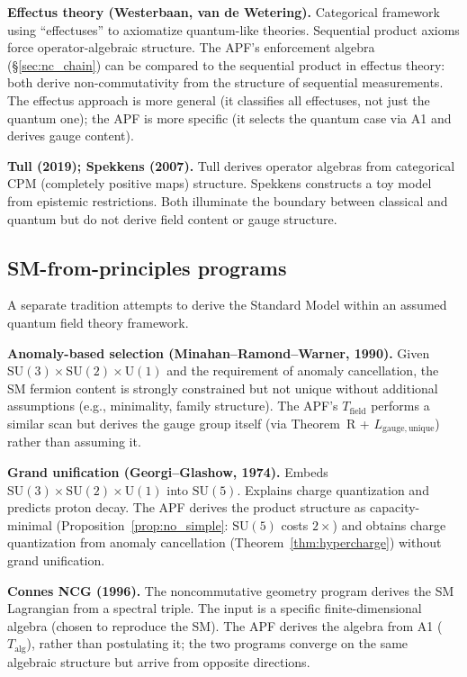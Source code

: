 \documentclass[11pt,a4paper]{article}
\theoremstyle{definition}
\newcommand{\SU}{\mathrm{SU}}
\newcommand{\U}{\mathrm{U}}
\begin{document}
\smallskip\noindent\textbf{Effectus theory (Westerbaan, van de Wetering).}\quad
Categorical framework using ``effectuses'' to axiomatize quantum-like
theories.  Sequential product axioms force operator-algebraic structure.
The APF's enforcement algebra (\S\ref{sec:nc_chain}) can be compared
to the sequential product in effectus theory: both derive
non-commutativity from the structure of sequential measurements.  The
effectus approach is more general (it classifies all effectuses, not
just the quantum one); the APF is more specific (it selects the
quantum case via A1 and derives gauge content).

\smallskip\noindent\textbf{Tull (2019); Spekkens (2007).}\quad
Tull derives operator algebras from categorical CPM (completely positive
maps) structure.  Spekkens constructs a toy model from epistemic
restrictions.  Both illuminate the boundary between classical and
quantum but do not derive field content or gauge structure.


\subsection{SM-from-principles programs}
\label{sec:sm_programs}

A separate tradition attempts to derive the Standard Model within an
assumed quantum field theory framework.

\smallskip\noindent\textbf{Anomaly-based selection
(Minahan--Ramond--Warner, 1990).}\quad
Given $\SU(3) \times \SU(2) \times \U(1)$ and the requirement of
anomaly cancellation, the SM fermion content is strongly constrained
but not unique without additional assumptions (e.g., minimality,
family structure).  The APF's $T_{\mathrm{field}}$ performs a similar
scan but derives the gauge group itself (via Theorem~R +
$L_{\mathrm{gauge,unique}}$) rather than assuming it.

\smallskip\noindent\textbf{Grand unification (Georgi--Glashow, 1974).}\quad
Embeds $\SU(3) \times \SU(2) \times \U(1)$ into $\SU(5)$.  Explains
charge quantization and predicts proton decay.  The APF derives the
product structure as capacity-minimal
(Proposition~\ref{prop:no_simple}: $\SU(5)$ costs $2\times$) and
obtains charge quantization from anomaly cancellation
(Theorem~\ref{thm:hypercharge}) without grand unification.

\smallskip\noindent\textbf{Connes NCG (1996).}\quad
The noncommutative geometry program derives the SM Lagrangian from a
spectral triple.  The input is a specific finite-dimensional algebra
(chosen to reproduce the SM).  The APF derives the algebra from A1
($T_{\mathrm{alg}}$), rather than postulating it; the two programs
converge on the same algebraic structure but arrive from opposite
directions.
\end{document}
